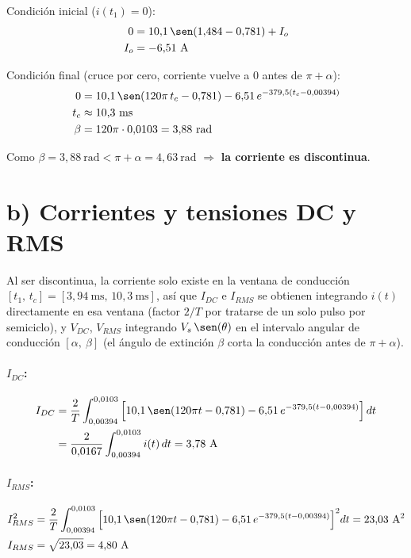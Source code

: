 \documentclass[11pt]{article}
\begin{document}
Condici\'on inicial ($i(t_1)=0$):
\begin{align*}
0 &= 10{,}1\,\sen(1{,}484 - 0{,}781) + I_o \\
I_o &= -6{,}51\ \text{A}
\end{align*}

Condici\'on final (cruce por cero, corriente vuelve a 0 antes de $\pi+\alpha$):
\begin{align*}
0 &= 10{,}1\,\sen(120\pi\,t_c - 0{,}781) - 6{,}51\,e^{-379{,}5(t_c - 0{,}00394)} \\
t_c &\approx 10{,}3\ \text{ms} \\
\beta &= 120\pi \cdot 0{,}0103 = 3{,}88\ \text{rad}
\end{align*}

Como $\beta = 3{,}88\ \text{rad} < \pi+\alpha = 4{,}63\ \text{rad}$
$\Rightarrow$ \textbf{la corriente es discontinua}.

\section*{b) Corrientes y tensiones DC y RMS}

Al ser discontinua, la corriente solo existe en la ventana de conducci\'on
$[t_1,\,t_c]=[3{,}94\ \text{ms},\,10{,}3\ \text{ms}]$, as\'i que $I_{DC}$ e
$I_{RMS}$ se obtienen integrando $i(t)$ directamente en esa ventana (factor
$2/T$ por tratarse de un solo pulso por semiciclo), y $V_{DC}$, $V_{RMS}$
integrando $V_s\,\sen(\theta)$ en el intervalo angular de conducci\'on
$[\alpha,\ \beta]$ (el \'angulo de extinci\'on $\beta$ corta la conducci\'on
antes de $\pi+\alpha$).

\paragraph{$I_{DC}$:}
\begin{align*}
I_{DC} &= \frac{2}{T}\int_{0{,}00394}^{0{,}0103}\Big[10{,}1\,\sen(120\pi t - 0{,}781) - 6{,}51\,e^{-379{,}5(t-0{,}00394)}\Big]\,dt \\
       &= \frac{2}{0{,}0167}\int_{0{,}00394}^{0{,}0103} i(t)\,dt = 3{,}78\ \text{A}
\end{align*}

\paragraph{$I_{RMS}$:}
\begin{align*}
I_{RMS}^2 &= \frac{2}{T}\int_{0{,}00394}^{0{,}0103}\Big[10{,}1\,\sen(120\pi t - 0{,}781) - 6{,}51\,e^{-379{,}5(t-0{,}00394)}\Big]^2 dt = 23{,}03\ \text{A}^2 \\
I_{RMS} &= \sqrt{23{,}03} = 4{,}80\ \text{A}
\end{align*}
\end{document}
